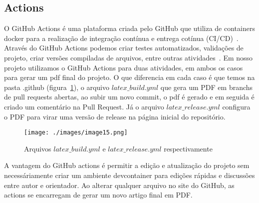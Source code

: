 \subsection{Actions}

O GitHub Actions é uma plataforma criada pelo GitHub que utiliza de containers docker para a realização de integração contínua e entrega cotínua (CI/CD)~\cite{github:02}. Através do GitHub Actions podemos criar testes automatizados, validações de projeto, criar versões compiladas de arquivos, entre outras atividades~\cite{github:02}. Em nosso projeto utilizamos o GitHub Actions para duas atividades, em ambos os casos para gerar um pdf final do projeto. O que diferencia em cada caso é que temos na pasta .github (figura~\ref{fig:image15}), o arquivo $latex\_build.yml$ que gera um PDF em branchs de pull requests abertas, ao subir um novo commit, o pdf é gerado e em seguida é criado um comentário na Pull Request. Já o arquivo $latex\_release.yml$ configura o PDF para virar uma versão de release na página inicial do repositório.

\begin{figure}[ht]
	\centering
	\texttt{[image: ./images/image15.png]}
	\caption{Arquivos $latex\_build.yml$ e $latex\_release.yml$ respectivamente}
	\label{fig:image15}
\end{figure}

A vantagem do GitHub actions é permitir a edição e atualização do projeto sem necessáriamente criar um ambiente devcontainer para edições rápidas e discussões entre autor e orientador. Ao alterar qualquer arquivo no site do GitHub, as actions se encarregam de gerar um novo artigo final em PDF.